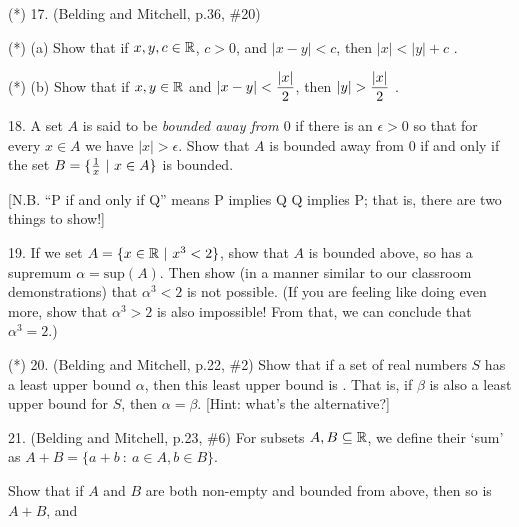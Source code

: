 \documentclass[12pt]{article}
\begin{document}
\begin{description}


\item{(*) 17.} (Belding and Mitchell, p.36, \#20)

\ssk

\item{(*)} (a) Show that if $x,y,c\in{\mathbb R}$, $c>0$, and $|x-y|<c$, then $|x|<|y|+c$ .

\ssk

\item{(*)} (b) Show that if $x,y\in{\mathbb R}$ and $\displaystyle |x-y|<{{|x|}\over{2}}$, 
then $\displaystyle |y|>{{|x|}\over{2}}$ .

\msk

\item{18.} A set $A$ is said to be {\it bounded away from $0$} if there is 
an $\epsilon>0$ so that for every $x\in A$ we have $|x|>\epsilon$. Show that $A$ is bounded away
from $0$ if and only if the set $B = \{ {{1}\over{x}}\ |\ x\in A\}$ is bounded.

\ssk

\item{\spc} [N.B. ``P if and only if Q'' means P implies Q  Q implies P; that is, 
there are two things to show!]

\msk

\item{19.} If we set $A = \{x\in\bbr\ |\ x^3<2\}$, show that $A$ is bounded above,
so has a supremum $\alpha=\textrm{sup}(A)$. Then show (in a manner similar to our
classroom demonstrations) that $\alpha^3<2$ is not possible. (If you are feeling
like doing even more, show that $\alpha^3>2$ is also impossible! 
From that, we can conclude that $\alpha^3=2$.)

\msk

\item{(*) 20.} (Belding and Mitchell, p.22, \#2) Show that
if a set of real numbers $S$ has a least upper bound $\alpha$, 
then this least
upper bound is . That is, if $\beta$ is also a least upper bound for $S$,
then $\alpha=\beta$. [Hint: what's the alternative?]

\msk

\item{21.} (Belding and Mitchell, p.23, \#6) For subsets 
$A,B\subseteq{\mathbb R}$, we define their `sum' as
$A+B=\{a+b\ :\ a\in A, b\in B\}$. 

\ssk

\item{\spc} Show that if $A$ and $B$ are both non-empty and
bounded from above, then so is $A+B$, and 


\end{description}
\end{document}
